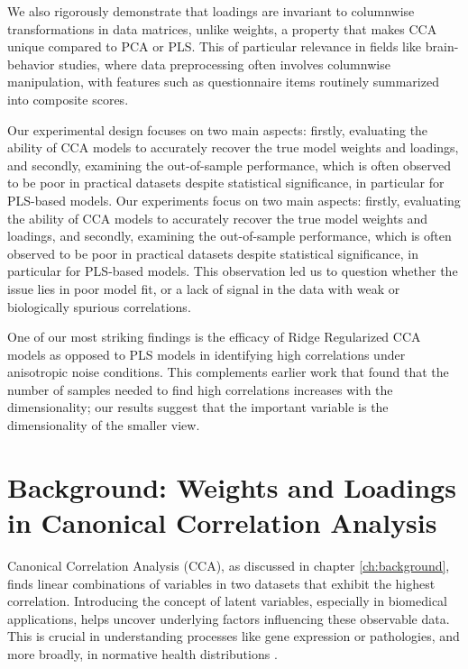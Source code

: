 We also rigorously demonstrate that loadings are invariant to columnwise transformations in data matrices, unlike weights, a property that makes CCA unique compared to PCA or PLS\@.
This of particular relevance in fields like brain-behavior studies, where data preprocessing often involves columnwise manipulation, with features such as questionnaire items routinely summarized into composite scores.

Our experimental design focuses on two main aspects: firstly, evaluating the ability of CCA models to accurately recover the true model weights and loadings, and secondly, examining the out-of-sample performance, which is often observed to be poor in practical datasets despite statistical significance, in particular for PLS-based models.
Our experiments focus on two main aspects: firstly, evaluating the ability of CCA models to accurately recover the true model weights and loadings, and secondly, examining the out-of-sample performance, which is often observed to be poor in practical datasets despite statistical significance, in particular for PLS-based models.
This observation led us to question whether the issue lies in poor model fit, or a lack of signal in the data with weak or biologically spurious correlations.

One of our most striking findings is the efficacy of Ridge Regularized CCA models as opposed to PLS models in identifying high correlations under anisotropic noise conditions.
This complements earlier work \citep{helmer2020stability} that found that the number of samples needed to find high correlations increases with the dimensionality; our results suggest that the important variable is the dimensionality of the smaller view.

\section{Background: Weights and Loadings in Canonical Correlation Analysis}

Canonical Correlation Analysis (CCA), as discussed in chapter \ref{ch:background}, finds linear combinations of variables in two datasets that exhibit the highest correlation.
Introducing the concept of latent variables, especially in biomedical applications, helps uncover underlying factors influencing these observable data.
This is crucial in understanding processes like gene expression or pathologies, and more broadly, in normative health distributions \citep{lawry2023multi}.

